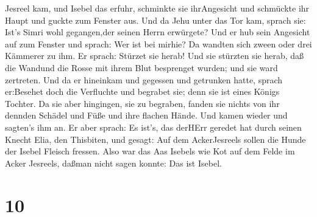 Jesreel kam, und Isebel das erfuhr, schminkte sie ihrAngesicht und
schmückte ihr Haupt und guckte zum Fenster aus.  Und da
Jehu unter das Tor kam, sprach sie: Ist's Simri wohl gegangen,der seinen
Herrn erwürgete?  Und er hub sein Angesicht auf zum Fenster
und sprach: Wer ist bei mirhie? Da wandten sich zween oder drei Kämmerer
zu ihm.  Er sprach: Stürzet sie herab! Und sie stürzten sie
herab, daß die Wandund die Rosse mit ihrem Blut besprenget wurden; und
sie ward zertreten.  Und da er hineinkam und gegessen und
getrunken hatte, sprach er:Besehet doch die Verfluchte und begrabet sie;
denn sie ist eines Königs Tochter.  Da sie aber hingingen,
sie zu begraben, fanden sie nichts von ihr dennden Schädel und Füße und
ihre flachen Hände.  Und kamen wieder und sagten's ihm an.
Er aber sprach: Es ist's, das derHErr geredet hat durch seinen Knecht
Elia, den Thisbiten, und gesagt: Auf dem AckerJesreels sollen die Hunde
der Isebel Fleisch fressen.  Also war das Aas Isebels wie
Kot auf dem Felde im Acker Jesreels, daßman nicht sagen konnte: Das ist
Isebel.

\hypertarget{section-9}{%
\section{10}\label{section-9}}

